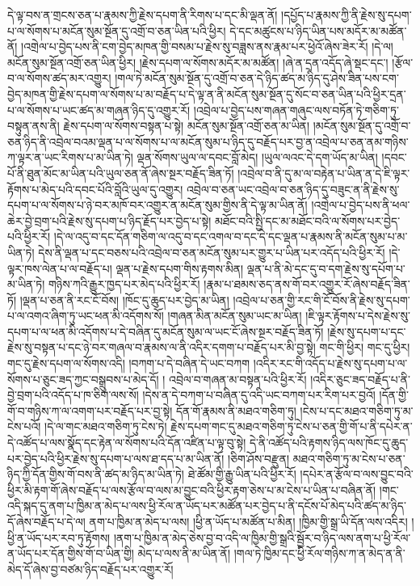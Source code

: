 དེ་ལྟ་བས་ན་གྲངས་ཅན་པ་རྣམས་ཀྱི་རྗེས་དཔག་ནི་རིགས་པ་དང་མི་ལྡན་ནོ། །དཔྱོད་པ་རྣམས་ཀྱི་ནི་རྗེས་སུ་དཔག་པ་ལ་སོགས་པ་མངོན་སུམ་སྔོན་དུ་འགྲོ་བ་ཅན་ཡིན་པའི་ཕྱིར། དེ་དང་མཚུངས་པ་ཉིད་ཡིན་པས་མདོར་མ་མཚོན་ནོ། །འགྲེལ་པ་བྱེད་པས་ནི་ངག་བྱེད་མཁན་གྱི་བསམ་པ་རྗེས་སུ་བཟླས་ནས་རྣམ་པར་ཕྱེའོ་ཞེས་ཟེར་རོ། །དེ་ལ། མངོན་སུམ་སྔོན་འགྲོ་ཅན་ཡིན་ཕྱིར། །རྗེས་དཔག་ལ་སོགས་མདོར་མ་མཚོན། །ཞེ་ན་དྲན་འདོད་ཞེ་སྡང་དང་། །རྩོལ་བ་ལ་སོགས་ཚད་མར་འགྱུར། །གལ་ཏེ་མངོན་སུམ་སྔོན་དུ་འགྲོ་བ་ཅན་དེ་ཉིད་ཚད་མ་ཉིད་དུ་ཤེས་ཟིན་པས་ངག་བྱེད་མཁན་གྱི་རྗེས་དཔག་ལ་སོགས་པ་མ་བརྗོད་པ་དེ་ལྟ་ན་ནི་མངོན་སུམ་སྔོན་དུ་སོང་བ་ཅན་ཡིན་པའི་ཕྱིར་དྲན་པ་ལ་སོགས་པ་ཡང་ཚད་མ་གཞན་ཉིད་དུ་འགྱུར་རོ། །འབྲེལ་པ་བྱེད་པས་གཞན་གཞུང་ལས་བཏོན་ཏེ་གཅིག་ཏུ་བསྟུན་ནས་ནི། རྗེས་དཔག་ལ་སོགས་བསྟན་པ་སྟེ། མངོན་སུམ་སྔོན་འགྲོ་ཅན་མ་ཡིན། །མངོན་སུམ་སྔོན་དུ་འགྲོ་བ་ཅན་ཉིད་ནི་འབྲེལ་བའམ་ལྡན་པ་ལ་སོགས་པ་ལ་མངོན་སུམ་པ་ཉིད་དུ་བརྗོད་པར་བྱ་ན་འབྲེལ་པ་ཅན་ནམ་གཉིས་ཀ་ལྟར་ན་ཡང་རིགས་པ་མ་ཡིན་ཏེ། ལྡན་སོགས་ཡུལ་ལ་དབང་བློ་མེད། །ཡུལ་ལའང་དེ་དག་ཡོད་མ་ཡིན། །དབང་པོ་ནི་ཐུན་མོང་མ་ཡིན་པའི་ཡུལ་ཅན་ནོ་ཞེས་སྔར་བརྗོད་ཟིན་ཏོ། །འབྲེལ་བ་ནི་དུ་མ་ལ་བརྟེན་པ་ཡིན་ན་དེ་ཇི་ལྟར་རྟོགས་པ་མེད་པའི་དབང་པོའི་བློའི་ཡུལ་དུ་འགྱུར། འབྲེལ་བ་ཅན་ཡང་འབྲེལ་བ་ཅན་ཉིད་དུ་བཟུང་ན་ནི་རྗེས་སུ་དཔག་པ་ལ་སོགས་པ་ཉེ་བར་མཁོ་བར་འགྱུར་ན་མངོན་སུམ་གྱིས་ནི་དེ་ལྟ་མ་ཡིན་ནོ། །འགྲེལ་པ་བྱེད་པས་ནི་ཕལ་ཆེར་བྱེ་བྲག་པའི་རྗེས་སུ་དཔག་པ་ཉིད་རྗོད་པར་བྱེད་པ་སྟེ། མཐོང་བའི་སྤྱི་དང་མ་མཐོང་བའི་ལ་སོགས་པར་བྱེད་པའི་ཕྱིར་རོ། །དེ་ལ་འདུ་བ་དང་དོན་གཅིག་ལ་འདུ་བ་དང་འགལ་བ་དང་དེ་དང་ལྡན་པ་རྣམས་ནི་མངོན་སུམ་པ་མ་ཡིན་ཏེ། དེས་ནི་ལྡན་པ་དང་བཅས་པའི་འབྲེལ་བ་ཅན་མངོན་སུམ་པར་གྱུར་པ་ཡིན་པར་འདོད་པའི་ཕྱིར་རོ། །དེ་ལྟར་ཁས་ལེན་པ་ལ་བརྗོད་པ། ལྡན་པ་རྗེས་དཔག་གིས་རྟགས་མིན། ལྡན་པ་ནི་མེ་དང་དུ་བ་དག་རྗེས་སུ་དཔོག་པ་མ་ཡིན་ཏེ། གཉིས་ཀའི་རྒྱུར་ཁྱད་པར་མེད་པའི་ཕྱིར་རོ། །རྣམ་པ་ཐམས་ཅད་ནས་གོ་བར་འགྱུར་རོ་ཞེས་བརྗོད་ཟིན་ཏོ། །ལྡན་པ་ཅན་ནི་རང་ངོ་བོས། །ཁོང་དུ་ཆུད་པར་བྱེད་མ་ཡིན། །འབྲེལ་པ་ཅན་གྱི་རང་གི་ངོ་བོས་ནི་རྗེས་སུ་དཔག་པ་ལ་འགའ་ཞིག་ཏུ་ཡང་ཕན་མི་འདོགས་སོ། །གཞན་མིན་མངོན་སུམ་ཡང་མ་ཡིན། །ཇི་ལྟར་རྟོགས་པ་དེས་རྗེས་སུ་དཔག་པ་ལ་ཕན་མི་འདོགས་པ་དེ་བཞིན་དུ་མངོན་སུམ་ལ་ཡང་ངོ་ཞེས་སྔར་བརྗོད་ཟིན་ཏོ། །རྗེས་སུ་དཔག་པ་དང་རྗེས་སུ་བསྟན་པ་དང་ཉེ་བར་གཞལ་བ་རྣམས་ལ་ནི་འདིར་དགག་པ་བརྗོད་པར་མི་བྱ་སྟེ། གང་གི་ཕྱིར། གང་དུ་ཕྱིར། གང་དུ་རྗེས་དཔག་ལ་སོགས་འདི། །བཀག་པ་དེ་བཞིན་དེ་ཡང་བཀག །འདིར་རང་གི་འདོད་པ་རྗེས་སུ་དཔག་པ་ལ་སོགས་པ་ཅུང་ཟད་ཀྱང་བསྒྲུབས་པ་མེད་དོ། ། འབྲེལ་བ་གཞན་མ་བསྟན་པའི་ཕྱིར་རོ། །འདིར་ཅུང་ཟད་བརྗོད་པ་ནི་བྱེ་བྲག་པའི་འདོད་པ་ཁ་ཅིག་ལས་སོ། །དེས་ན་དེ་བཀག་པ་བཞིན་དུ་འདི་ཡང་བཀག་པར་རིག་པར་བྱའོ། །དོན་གྱི་གོ་བ་གཉིས་ཀ་ལ་འགག་པར་བརྗོད་པར་བྱ་སྟེ། དོན་གོ་རྣམས་ནི་མཐའ་གཅིག་ཏུ། །ངེས་པ་དང་མཐའ་གཅིག་ཏུ་མ་ངེས་པའོ། །དེ་ལ་གང་མཐའ་གཅིག་ཏུ་ངེས་ཏེ། རྗེས་དཔག་གང་དུ་མཐའ་གཅིག་ཏུ་ངེས་པ་ཅན་གྱི་གོ་པ་ནི་དཔེར་ན་དེ་འཚོད་པ་ལས་སྣོད་དང་རྟེན་ལ་སོགས་པའི་དོན་འཛིན་པ་ལྟ་བུ་སྟེ། དེ་ནི་འཚོད་པའི་རྟགས་ཉིད་ལས་ཁོང་དུ་ཆུད་པར་བྱེད་པའི་ཕྱིར་རྗེས་སུ་དཔག་པ་ལས་ཐ་དད་པ་མ་ཡིན་ནོ། །ཅིག་ཤོས་བརྫུན། མཐའ་གཅིག་ཏུ་མ་ངེས་པ་ཅན་ཉིད་ཀྱི་དོན་གྱིས་གོ་བས་ནི་ཚད་མ་ཉིད་མ་ཡིན་ཏེ། ཐེ་ཚོམ་གྱི་རྒྱུ་ཡིན་པའི་ཕྱིར་རོ། །དཔེར་ན་རྩོལ་བ་ལས་བྱུང་བའི་ཕྱིར་མི་རྟག་གོ་ཞེས་བརྗོད་པ་ལས་རྩོལ་བ་ལས་མ་བྱུང་བའི་ཕྱིར་རྟག་ཅེས་པ་མ་ངེས་པ་ཡིན་པ་བཞིན་ནོ། །གང་འདི་སྐད་དུ་ནག་པ་ཁྱིམ་ན་མེད་པ་ལས་ཕྱི་རོལ་ན་ཡོད་པར་མཚོན་པར་བྱེད་པ་ནི་དངོས་པོ་མེད་པའི་ཚད་མ་ཉིད་དོ་ཞེས་བརྗོད་པ་དེ་ལ། ནག་པ་ཁྱིམ་ན་མེད་པ་ལས། །ཕྱི་ན་ཡོད་པ་མཚོན་པ་མིན། །ཁྱིམ་གྱི་སྒྲ་ཡི་དོན་ལས་འདིར། །ཕྱི་ན་ཡོད་པར་རབ་ཏུ་རྟོགས། །ནག་པ་ཁྱིམ་ན་མེད་ཅེས་བྱ་བ་འདི་ལ་ཁྱིམ་གྱི་སྒྲའི་སྦྱོར་བ་ཉིད་ལས་ནག་པ་ཕྱི་རོལ་ན་ཡོད་པར་དོན་གྱིས་གོ་བ་ཡིན་གྱི། མེད་པ་ལས་ནི་མ་ཡིན་ནོ། །གལ་ཏེ་ཁྱིམ་དང་ཕྱི་རོལ་གཉིས་ཀ་ན་མེད་ན་ནི་མེད་དོ་ཞེས་བྱ་བཙམ་ཉིད་བརྗོད་པར་འགྱུར་རོ། 